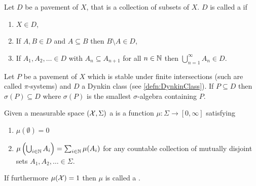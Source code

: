 \begin{defn}
  Let $D$ be a pavement of $X$,
  that is a collection of subsets of $X$.
  $D$ is called a  if
  \begin{enumerate}
    \item $X \in D$,
    \item If $A, B \in D$ and $A \subseteq B$ then $B \setminus A \in D$,
    \item If $A_1, A_2, \dots \in D$ with $A_n \subseteq A_{n+1}$ for
      all $n \in \mathbb{N}$ then $\bigcup_{n=1}^\infty A_n \in D$.
  \end{enumerate}
  \label{defn:DynkinClass}
\end{defn}

\begin{thm}
  Let $P$ be a pavement of $X$ which is stable under finite intersections
  (such are called $\pi$-systems) and $D$ a Dynkin class
  (see \cref{defn:DynkinClass}).
  If $P \subseteq D$ then $\sigma(P) \subseteq D$
  where $\sigma(P)$ is the smallest $\sigma$-algebra containing $P$.
  \label{thm:DynkinPiLambda}
\end{thm}

\begin{defn}[Measure]
  Given a measurable space $(\mathcal{X}, \Sigma)$ a 
  is a function $\mu : \Sigma \to [0, \infty]$ satisfying
  \begin{enumerate}
    \item $\mu(\emptyset) = 0$
    \item $\mu\left( \bigcup_{i \in \mathbb{N}} A_i \right) =
      \sum_{i \in \mathbb{N}} \mu(A_i)$
      for any countable collection of mutually disjoint sets
      $A_1, A_2, \dots \in \Sigma$.
  \end{enumerate}
  If furthermore $\mu(\mathcal{X}) = 1$ then $\mu$ is called a
  .
\end{defn}

